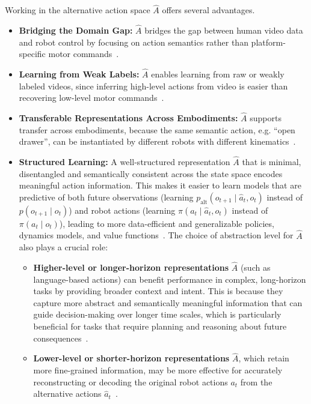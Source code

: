 Working in the alternative action space $\hat{A}$ offers several advantages. 
\begin{itemize}
    \item \textbf{Bridging the Domain Gap:} $\hat{A}$ bridges the gap between human video data and robot control by focusing on action semantics rather than platform-specific motor commands~\cite{McCarthy_2025}. 
    
    \item \textbf{Learning from Weak Labels:} $\hat{A}$ enables learning from raw or weakly labeled videos, since inferring high-level actions from video is easier than recovering low-level motor commands~\cite{McCarthy_2025}.
    
    \item \textbf{Transferable Representations Across Embodiments:} $\hat{A}$ supports transfer across embodiments, because the same semantic action, e.g. ``open drawer'', can be instantiated by different robots with different kinematics~\cite{McCarthy_2025}.

    \item \textbf{Structured Learning:} A well-structured representation $\hat{A}$ that is minimal, disentangled and semantically consistent across the state space encodes meaningful action information. This makes it easier to learn models that are predictive of both future observations (learning $p_{\text{alt}}(o_{t+1} \mid \hat{a}_t, o_t)$ instead of $p(o_{t+1} \mid o_t)$) and robot actions (learning $\pi(a_t \mid \hat{a}_t, o_t)$ instead of $\pi(a_t \mid o_t)$), leading to more data-efficient and generalizable policies, dynamics models, and value functions~\cite{McCarthy_2025, Rybkin2018LearningWY, Bruce2024GenieGI}.
    The choice of abstraction level for $\hat{A}$ also plays a crucial role: 
    \begin{itemize}
        \item \textbf{Higher-level or longer-horizon representations} $\hat{A}$ (such as language-based actions) can benefit performance in complex, long-horizon tasks by providing broader context and intent. This is because they capture more abstract and semantically meaningful information that can guide decision-making over longer time scales, which is particularly beneficial for tasks that require planning and reasoning about future consequences~\cite{McCarthy_2025}.
        \item \textbf{Lower-level or shorter-horizon representations} $\hat{A}$, which retain more fine-grained information, may be more effective for accurately reconstructing or decoding the original robot actions $a_t$ from the alternative actions $\hat{a}_t$~\cite{McCarthy_2025}.
    \end{itemize}
\end{itemize}
